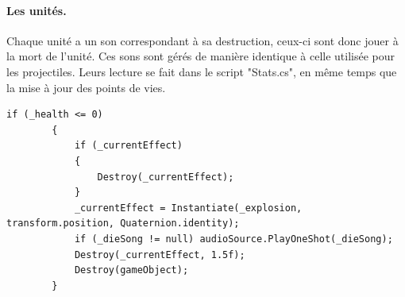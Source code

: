 \documentclass{report}
\begin{document}
\paragraph{Les unités.}
Chaque unité a un son correspondant à sa destruction, ceux-ci sont donc jouer à la mort de l'unité. Ces sons sont gérés de manière identique à celle utilisée pour les projectiles. Leurs lecture se fait dans le script "Stats.cs", en même temps que la mise à jour des points de vies. 
\begin{lstlisting}[language={[Sharp]C},label={lst:bulletAudio}, caption= Extrait du code de Stats.cs ]
if (_health <= 0)
        {
            if (_currentEffect)
            {
                Destroy(_currentEffect);
            }
            _currentEffect = Instantiate(_explosion, transform.position, Quaternion.identity);
            if (_dieSong != null) audioSource.PlayOneShot(_dieSong);
            Destroy(_currentEffect, 1.5f);
            Destroy(gameObject);
        }
\end{lstlisting}
\end{document}
